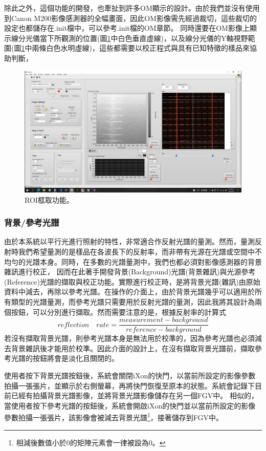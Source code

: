 \documentclass[12pt]{article}
\begin{document}
除此之外，這個功能的開發，也牽扯到許多OM顯示的設計。由於我們並沒有使用到Canon M200影像感測器的全幅畫面，因此OM影像需先經過裁切，這些裁切的設定也都儲存在.init檔中，可以參考.init檔的OM章節。
同時還要在OM影像上顯示線分光儀當下所觀測的位置(圖\ref{figure: roi}中白色垂直虛線)，以及線分光儀的Y軸視野範圍(圖\ref{figure: roi}中兩條白色水明虛線)，這些都需要以校正程式與具有已知特徵的樣品來協助判斷，
\begin{figure}
    \centering
    \includegraphics[width=\linewidth]{roi.jpeg}
    \caption{ROI框取功能。}
    \label{figure: roi}
\end{figure}

\subsubsection{背景/參考光譜} \label{sec: bkg/ref}
由於本系統以平行光進行照射的特性，非常適合作反射光譜的量測。然而，量測反射時我們希望量測的是樣品在各波長下的反射率，而非帶有光源在光譜或空間中不均勻的光譜本身。同時，在多數的光譜量測中，我們也都必須對影像感測器的背景雜訊進行校正，
因而在此著手開發背景(Background)光譜(背景雜訊)與光源參考(Reference)光譜的擷取與校正功能。實際進行校正時，是將背景光譜(雜訊)由原始資料中減去，再除以參考光譜。在操作的介面上，由於背景光譜幾乎可以適用於所有類型的光譜量測，而參考光譜只需要用於反射光譜的量測，因此我將其設計為兩個按鈕，可以分別進行擷取。然而需要注意的是，根據反射率的計算式
\begin{equation}\label{equation: reflection}
    reflection \quad rate=\frac{measurement-background}{reference-background}
\end{equation}
若沒有擷取背景光譜，則參考光譜本身是無法用於校準的，因為參考光譜也必須減去背景雜訊後才能用於校準。因此介面的設計上，在沒有擷取背景光譜前，擷取參考光譜的按鈕將會是淡化且關閉的。

使用者按下背景光譜按鈕後，系統會關閉iXon的快門，以當前所設定的影像參數拍攝一張張片，並顯示於右側螢幕，再將快門恢復至原本的狀態。系統會記錄下目前已經有拍攝背景光譜影像，並將背景光譜影像儲存在另一個FGV中。
相似的，當使用者按下參考光譜的按鈕後，系統會開啟iXon的快門並以當前所設定的影像參數拍攝一張張片，該影像會被減去背景光譜\footnote{相減後數值小於0的矩陣元素會一律被設為0。}，接著儲存到FGV中。
\end{document}
